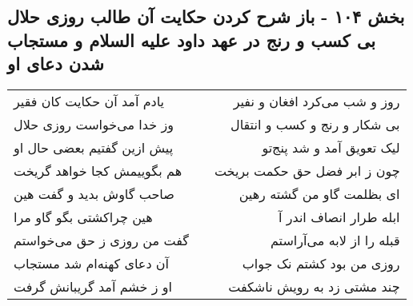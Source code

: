 \begin{center}
\section*{بخش ۱۰۴ - باز شرح کردن حکایت آن طالب روزی حلال بی کسب و رنج در عهد داود علیه السلام  و مستجاب شدن دعای او}
\label{sec:sh104}
\begin{longtable}{l p{0.5cm} r}
یادم آمد آن حکایت کان فقیر
&&
روز و شب می‌کرد افغان و نفیر
\\
وز خدا می‌خواست روزی حلال
&&
بی شکار و رنج و کسب و انتقال
\\
پیش ازین گفتیم بعضی حال او
&&
لیک تعویق آمد و شد پنج‌تو
\\
هم بگوییمش کجا خواهد گریخت
&&
چون ز ابر فضل حق حکمت بریخت
\\
صاحب گاوش بدید و گفت هین
&&
ای بظلمت گاو من گشته رهین
\\
هین چراکشتی بگو گاو مرا
&&
ابله طرار انصاف اندر آ
\\
گفت من روزی ز حق می‌خواستم
&&
قبله را از لابه می‌آراستم
\\
آن دعای کهنه‌ام شد مستجاب
&&
روزی من بود کشتم نک جواب
\\
او ز خشم آمد گریبانش گرفت
&&
چند مشتی زد به رویش ناشکفت
\\
\end{longtable}
\end{center}
